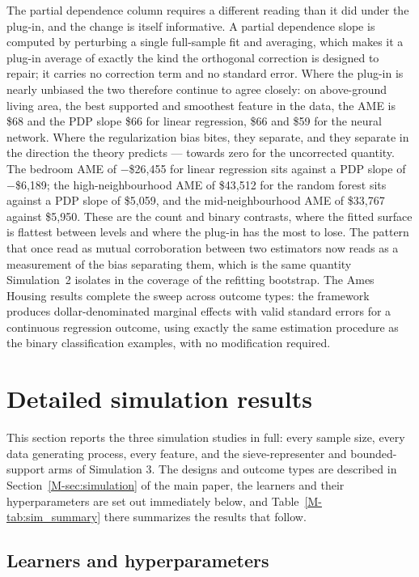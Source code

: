 \documentclass[12pt,a4paper]{article}
\numberwithin{equation}{section}
\theoremstyle{plain}
\theoremstyle{definition}
\begin{document}
	The partial dependence column requires a different reading than it did under the plug-in, and the change is itself informative. A partial dependence slope is computed by perturbing a single full-sample fit and averaging, which makes it a plug-in average of exactly the kind the orthogonal correction is designed to repair; it carries no correction term and no standard error. Where the plug-in is nearly unbiased the two therefore continue to agree closely: on above-ground living area, the best supported and smoothest feature in the data, the AME is \$68 and the PDP slope \$66 for linear regression, \$66 and \$59 for the neural network. Where the regularization bias bites, they separate, and they separate in the direction the theory predicts --- towards zero for the uncorrected quantity. The bedroom AME of $-$\$26,455 for linear regression sits against a PDP slope of $-$\$6,189; the high-neighbourhood AME of \$43,512 for the random forest sits against a PDP slope of \$5,059, and the mid-neighbourhood AME of \$33,767 against \$5,950. These are the count and binary contrasts, where the fitted surface is flattest between levels and where the plug-in has the most to lose. The pattern that once read as mutual corroboration between two estimators now reads as a measurement of the bias separating them, which is the same quantity Simulation~2 isolates in the coverage of the refitting bootstrap. The Ames Housing results complete the sweep across outcome types: the framework produces dollar-denominated marginal effects with valid standard errors for a continuous regression outcome, using exactly the same estimation procedure as the binary classification examples, with no modification required.
	
	\section{Detailed simulation results}
	\label{app:sim_detail}

	This section reports the three simulation studies in full: every
	sample size, every data generating process, every feature, and the
	sieve-representer and bounded-support arms of Simulation 3. The
	designs and outcome types are described in
	Section~\ref{M-sec:simulation} of the main paper, the learners and their
	hyperparameters are set out immediately below, and
	Table~\ref{M-tab:sim_summary} there summarizes the results that
	follow.

	\subsection*{Learners and hyperparameters}
\end{document}
